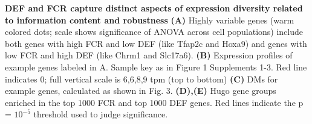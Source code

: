 \textbf{DEF and FCR capture distinct aspects of expression diversity related to information content and robustness} \textbf{(A)} Highly variable genes (warm colored dots; scale shows significance of ANOVA across cell populations) include both genes with high FCR and low DEF (like Tfap2c and Hoxa9) and genes with low FCR and high DEF (like Chrm1 and Slc17a6). \textbf{(B)} Expression profiles of example genes labeled in A. Sample key as in Figure 1 Supplements 1-3. Red line indicates 0; full vertical scale is 6,6,8,9 tpm (top to bottom) \textbf{(C)} DMs for example genes, calculated as shown in Fig. 3. \textbf{(D),(E)} Hugo gene groups enriched in the top 1000 FCR and top 1000 DEF genes. Red lines indicate the p = $10^{-5}$ threshold used to judge significance.